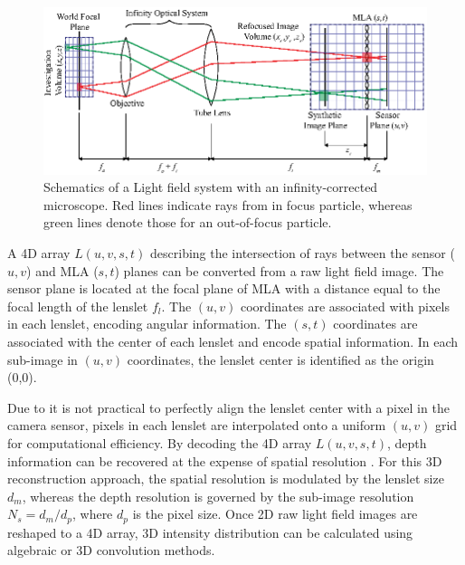 \documentclass[draftthesis,fullpage]{uiucthesis}
\begin{document}
\begin{figure}[h]
       \centerline{\includegraphics[width=1\linewidth]{fig/LFM.eps}}
         \caption{Schematics of a Light field system with an infinity-corrected microscope. Red lines indicate rays from in focus particle, whereas green lines denote those for an out-of-focus particle.}
       \label{fig:lf_principle}
\end{figure}

A 4D array $L(u,v,s,t) $ \citep{levoy1996light} describing the intersection of rays between the sensor ($u,v$) and MLA ($s,t$) planes can be converted from a raw light field image.  The sensor plane is located at the focal plane of MLA with a distance equal to the focal length of the lenslet $f_l$. The $(u,v)$ coordinates are associated with pixels in each lenslet, encoding angular information. The $(s,t)$ coordinates are associated with the center of each lenslet and encode spatial information. In each sub-image in $(u,v)$ coordinates, the lenslet center is identified as the origin (0,0).

Due to it is not practical to perfectly align the lenslet center with a pixel in the camera sensor, pixels in each lenslet are interpolated onto a uniform $(u,v)$ grid for computational efficiency. By decoding the 4D array $L(u,v,s,t)$, depth information can be recovered at the expense of spatial resolution \citep{levoy2006light}. For this 3D reconstruction approach, the spatial resolution is modulated by the lenslet size $d_m$, whereas the depth resolution is governed by the sub-image resolution $N_s = d_m / d_p$, where $d_p$ is the pixel size.  Once 2D raw light field images are reshaped to a 4D array, 3D intensity distribution can be calculated using algebraic or 3D convolution methods. 
\end{document}
